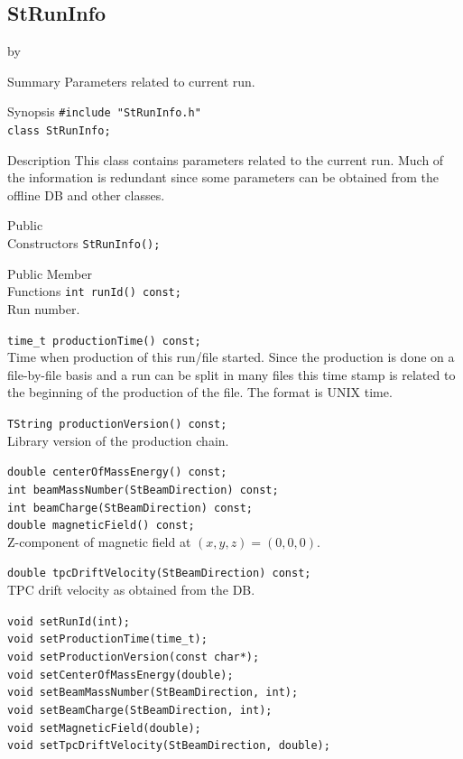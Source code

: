 \documentclass[twoside]{article}
\newcommand{\entrylabel}[1]{\mbox{\textbf{{#1}}}\hfil}%
\newenvironment{entry}
{\begin{list}{}%
    {\renewcommand{\makelabel}{\entrylabel}%
     \setlength{\labelwidth}{90pt}%
     \setlength{\leftmargin}{\labelwidth}
     \advance\leftmargin by \labelsep%
      }%
    }%
  {\end{list}}
\newcommand{\Entrylabel}[1]%
{\raisebox{0pt}[1ex][0pt]{\makebox[\labelwidth][l]%
    {\parbox[t]{\labelwidth}{\hspace{0pt}\textbf{{#1}}}}}}
\newenvironment{Entry}%
{\renewcommand{\entrylabel}{\Entrylabel}\begin{entry}}%
  {\end{entry}}
\begin{document}
\subsection{StRunInfo}
\label{sec:StRunInfo}
\begin{Entry}
\item[Summary]
    Parameters related to current run.
\item[Synopsis]
    \verb+#include "StRunInfo.h"+\\
    \verb+class StRunInfo;+\\
\item[Description]
    This class contains parameters related to the current run.
    Much of the information is redundant since some parameters
    can be obtained from the offline DB and other classes.
        
\item[Public\\ Constructors]
    \verb+StRunInfo();+\\
    
\item[Public Member\\ Functions]
    \verb+int runId() const;+\\
    Run number.
    
    \verb+time_t productionTime() const;+\\
    Time when production of this run/file started. Since the
    production is done on a file-by-file basis and a run can be split
    in many files this time stamp is related to the beginning of the
    production of the file. The format is UNIX time.
    
    \verb+TString productionVersion() const;+\\
    Library version of the production chain.
    
    \verb+double centerOfMassEnergy() const;+\\
    \verb+int beamMassNumber(StBeamDirection) const;+\\
    \verb+int beamCharge(StBeamDirection) const;+\\
    \verb+double magneticField() const;+\\
    Z-component of magnetic field at $(x,y,z)=(0,0,0)$.
    
    \verb+double tpcDriftVelocity(StBeamDirection) const;+\\
    TPC drift velocity as obtained from the DB.
    
    \verb+void setRunId(int);+\\
    \verb+void setProductionTime(time_t);+\\
    \verb+void setProductionVersion(const char*);+\\
    \verb+void setCenterOfMassEnergy(double);+\\
    \verb+void setBeamMassNumber(StBeamDirection, int);+\\
    \verb+void setBeamCharge(StBeamDirection, int);+\\
    \verb+void setMagneticField(double);+\\
    \verb+void setTpcDriftVelocity(StBeamDirection, double);+\\
\end{Entry}
\clearpage
\end{document}
